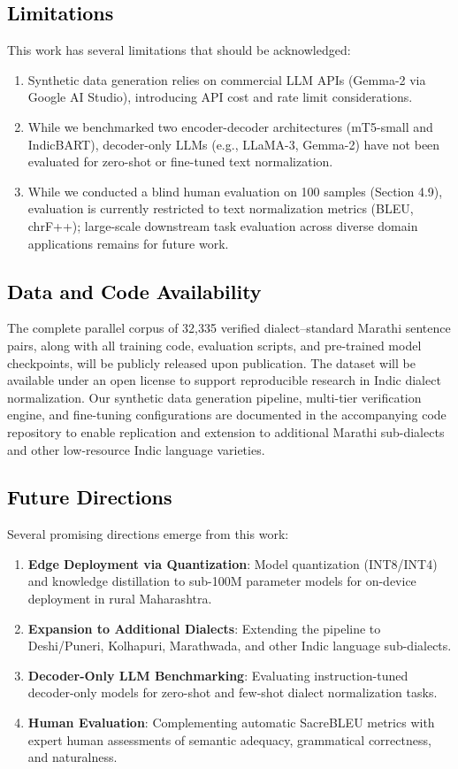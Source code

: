 \subsection{\textcolor{black}{Limitations}}

This work has several limitations that should be acknowledged:
\begin{enumerate}
    \item Synthetic data generation relies on commercial LLM APIs (Gemma-2 via Google AI Studio), introducing API cost and rate limit considerations.
    \item While we benchmarked two encoder-decoder architectures (mT5-small and IndicBART), decoder-only LLMs (e.g., LLaMA-3, Gemma-2) have not been evaluated for zero-shot or fine-tuned text normalization.
    \item While we conducted a blind human evaluation on 100 samples (Section 4.9), evaluation is currently restricted to text normalization metrics (BLEU, chrF++); large-scale downstream task evaluation across diverse domain applications remains for future work.
\end{enumerate}


\subsection{\textcolor{black}{Data and Code Availability}}

The complete parallel corpus of 32,335 verified dialect--standard Marathi sentence pairs, along with all training code, evaluation scripts, and pre-trained model checkpoints, will be publicly released upon publication. The dataset will be available under an open license to support reproducible research in Indic dialect normalization. Our synthetic data generation pipeline, multi-tier verification engine, and fine-tuning configurations are documented in the accompanying code repository to enable replication and extension to additional Marathi sub-dialects and other low-resource Indic language varieties.

\subsection{\textcolor{black}{Future Directions}}

Several promising directions emerge from this work:
\begin{enumerate}
    \item \textbf{Edge Deployment via Quantization}: Model quantization (INT8/INT4) and knowledge distillation to sub-100M parameter models for on-device deployment in rural Maharashtra.
    \item \textbf{Expansion to Additional Dialects}: Extending the pipeline to Deshi/Puneri, Kolhapuri, Marathwada, and other Indic language sub-dialects.
    \item \textbf{Decoder-Only LLM Benchmarking}: Evaluating instruction-tuned decoder-only models for zero-shot and few-shot dialect normalization tasks.
    \item \textbf{Human Evaluation}: Complementing automatic SacreBLEU metrics with expert human assessments of semantic adequacy, grammatical correctness, and naturalness.
\end{enumerate}
